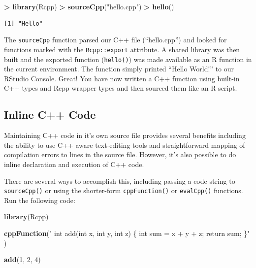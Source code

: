 \documentclass[
]{krantz}
\makeatletter
\newenvironment{Shaded}{\begin{snugshade}}{\end{snugshade}}
\newcommand{\DecValTok}[1]{\textcolor[rgb]{0.06,0.06,0.06}{#1}}
\newcommand{\KeywordTok}[1]{\textcolor[rgb]{0.27,0.27,0.27}{\textbf{#1}}}
\newcommand{\NormalTok}[1]{#1}
\newcommand{\OperatorTok}[1]{\textcolor[rgb]{0.43,0.43,0.43}{\textbf{#1}}}
\newcommand{\StringTok}[1]{\textcolor[rgb]{0.5,0.5,0.5}{#1}}
\newenvironment{kframe}{%
\medskip{}
\setlength{\fboxsep}{.8em}
 \def\at@end@of@kframe{}%
 \ifinner\ifhmode%
  \def\at@end@of@kframe{\end{minipage}}%
  \begin{minipage}{\columnwidth}%
 \fi\fi%
 \def\FrameCommand##1{\hskip\@totalleftmargin \hskip-\fboxsep
 \colorbox{shadecolor}{##1}\hskip-\fboxsep
     \hskip-\linewidth \hskip-\@totalleftmargin \hskip\columnwidth}%
 \MakeFramed {\advance\hsize-\width
   \@totalleftmargin\z@ \linewidth\hsize
   \@setminipage}}%
 {\par\unskip\endMakeFramed%
 \at@end@of@kframe}
\renewenvironment{Shaded}{\begin{kframe}}{\end{kframe}}
\makeatother
\begin{document}
\begin{Shaded}
\begin{Highlighting}[]
\OperatorTok{\textgreater{}}\StringTok{ }\KeywordTok{library}\NormalTok{(Rcpp)}
\OperatorTok{\textgreater{}}\StringTok{ }\KeywordTok{sourceCpp}\NormalTok{(}\StringTok{"hello.cpp"}\NormalTok{)}
\OperatorTok{\textgreater{}}\StringTok{ }\KeywordTok{hello}\NormalTok{()}
\end{Highlighting}
\end{Shaded}

\begin{verbatim}
[1] "Hello"
\end{verbatim}

The \texttt{sourceCpp} function parsed our C++ file (``hello.cpp'') and looked for functions marked with the \texttt{Rcpp::export} attribute. A shared library was then built and the exported function (\texttt{hello()}) was made available as an R function in the current environment. The function simply printed ``Hello World!'' to our RStudio Console. Great! You have now written a C++ function using built-in C++ types and Rcpp wrapper types and then sourced them like an R script.

\hypertarget{inline-c-code}{%
\subsection{Inline C++ Code}\label{inline-c-code}}

Maintaining C++ code in it's own source file provides several benefits including the ability to use C++ aware text-editing tools and straightforward mapping of compilation errors to lines in the source file. However, it's also possible to do inline declaration and execution of C++ code.

There are several ways to accomplish this, including passing a code string to \texttt{sourceCpp()} or using the shorter-form \texttt{cppFunction()} or \texttt{evalCpp()} functions. Run the following code:

\begin{Shaded}
\begin{Highlighting}[]
\KeywordTok{library}\NormalTok{(Rcpp)}

\KeywordTok{cppFunction}\NormalTok{(}\StringTok{"}
\StringTok{  int add(int x, int y, int z) \{}
\StringTok{    int sum = x + y + z;}
\StringTok{    return sum;}
\StringTok{  \}"}
\NormalTok{)}

\KeywordTok{add}\NormalTok{(}\DecValTok{1}\NormalTok{, }\DecValTok{2}\NormalTok{, }\DecValTok{4}\NormalTok{)}
\end{Highlighting}
\end{Shaded}
\end{document}
